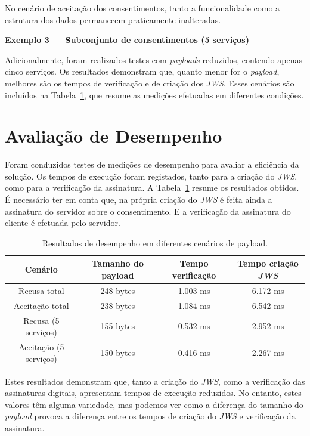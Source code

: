 No cenário de aceitação dos consentimentos, tanto a funcionalidade como a estrutura dos dados permanecem praticamente inalteradas.

\textbf{Exemplo 3 — Subconjunto de consentimentos (5 serviços)}

Adicionalmente, foram realizados testes com \textit{payloads} reduzidos, contendo apenas cinco serviços.
Os resultados demonstram que, quanto menor for o \textit{payload}, melhores são os tempos de verificação e de criação dos \textit{JWS}.
Esses cenários são incluídos na Tabela~\ref{tab:performance}, que resume as medições efetuadas em diferentes condições.

\section{Avaliação de Desempenho}

Foram conduzidos testes de medições de desempenho para avaliar a eficiência da solução. Os tempos de execução foram registados, tanto para a criação do \textit{JWS}, como para a verificação da assinatura. A Tabela~\ref{tab:performance} resume os resultados obtidos.
É necessário ter em conta que, na própria criação do \textit{JWS} é feita ainda a assinatura do servidor sobre o consentimento. E a verificação da assinatura do cliente é efetuada pelo servidor.

\begin{table}[h]
    \centering
    \caption{Resultados de desempenho em diferentes cenários de payload.}
    \label{tab:performance}
    \begin{tabular}{|c|c|c|c|}
        \hline
	\textbf{Cenário} & \textbf{Tamanho do payload} & \textbf{Tempo verificação} & \textbf{Tempo criação \textit{JWS}} \\ \hline
        Recusa total   & 248 bytes & 1.003 ms & 6.172 ms \\ \hline
        Aceitação total & 238 bytes & 1.084 ms & 6.542 ms \\ \hline
        Recusa (5 serviços) & 155 bytes & 0.532 ms & 2.952 ms \\ \hline
        Aceitação (5 serviços) & 150 bytes & 0.416 ms & 2.267 ms \\ \hline
    \end{tabular}
\end{table}

Estes resultados demonstram que, tanto a criação do \textit{JWS}, como a verificação das assinaturas digitais, apresentam tempos de execução reduzidos. No entanto, estes valores têm alguma variedade, mas podemos ver como a diferença do tamanho do \textit{payload} provoca a diferença entre os tempos de criação do \textit{JWS} e verificação da assinatura.


